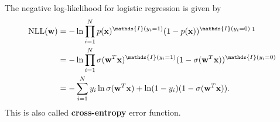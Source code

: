 The negative log-likelihood for logistic regression is given by
\begin{align*}
	\textrm{NLL}(\mathbf{w}) &= -\ln \prod_{i=1}^N p(\rvx)^{\mathds{I}(y_i=1)}(1-p(\rvx))^{\mathds{I}(y_i=0)}\,\footnotemark\\
							 &= -\ln \prod_{i=1}^N \sigma(\mathbf{w}^T\rvx)^{\mathds{I}(y_i=1)}(1-\sigma(\mathbf{w}^T\rvx))^{\mathds{I}(y_i=0)}\\
							 &= -\sum_{i=1}^N y_i\ln\sigma(\mathbf{w}^T\rvx)+\ln(1-y_i)(1-\sigma(\mathbf{w}^T\rvx)).
\end{align*}
This is also called \textbf{cross-entropy} error function. 

